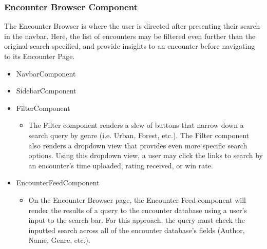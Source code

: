 \documentclass[12pt,a4paper]{report}
\begin{document}
		\subsubsection{Encounter Browser Component}
		The Encounter Browser is where the user is directed after presenting their search in the navbar. Here, the list of encounters may be filtered even further than the original search specified, and provide insights to an encounter before navigating to its Encounter Page.
		\begin{itemize}
			\item NavbarComponent
			\item SidebarComponent
			\item FilterComponent
			\begin{itemize}
				\item The Filter component renders a slew of buttons that narrow down a search query by genre (i.e. Urban, Forest, etc.). The Filter component also renders a dropdown view that provides even more specific search options. Using this dropdown view, a user may click the links to search by an encounter's time uploaded, rating received, or win rate.
			\end{itemize}
			\item EncounterFeedComponent
			\begin{itemize}
				\item On the Encounter Browser page, the Encounter Feed component will render the results of a query to the encounter database using a user's input to the search bar. For this approach, the query must check the inputted search across all of the encounter database's fields (Author, Name, Genre, etc.).
			\end{itemize}
		\end{itemize}
\end{document}
